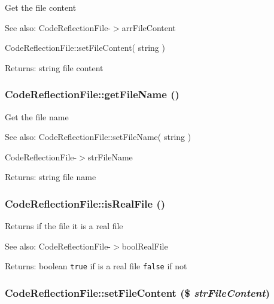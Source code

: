 Get the file content

\begin{Desc}
\item[See also:]CodeReflectionFile-$>$arrFileContent 

CodeReflectionFile::setFileContent( string ) \end{Desc}
\begin{Desc}
\item[Returns:]string file content \end{Desc}
\hypertarget{class_code_reflection_file_fd1320273fcd2bbeada22a40d33974ae}{
\subsubsection[{getFileName}]{\setlength{\rightskip}{0pt plus 5cm}CodeReflectionFile::getFileName ()}}
\label{class_code_reflection_file_fd1320273fcd2bbeada22a40d33974ae}


Get the file name

\begin{Desc}
\item[See also:]CodeReflectionFile::setFileName( string ) 

CodeReflectionFile-$>$strFileName \end{Desc}
\begin{Desc}
\item[Returns:]string file name \end{Desc}
\hypertarget{class_code_reflection_file_995a74eebd5970a3bbe99c27a231600a}{
\subsubsection[{isRealFile}]{\setlength{\rightskip}{0pt plus 5cm}CodeReflectionFile::isRealFile ()}}
\label{class_code_reflection_file_995a74eebd5970a3bbe99c27a231600a}


Returns if the file it is a real file

\begin{Desc}
\item[See also:]CodeReflectionFile-$>$boolRealFile \end{Desc}
\begin{Desc}
\item[Returns:]boolean {\tt true} if is a real file {\tt false} if not \end{Desc}
\hypertarget{class_code_reflection_file_8bd4ac0c26519528027a9f2a2840ce77}{
\subsubsection[{setFileContent}]{\setlength{\rightskip}{0pt plus 5cm}CodeReflectionFile::setFileContent (\$ {\em strFileContent})}}
\label{class_code_reflection_file_8bd4ac0c26519528027a9f2a2840ce77}


